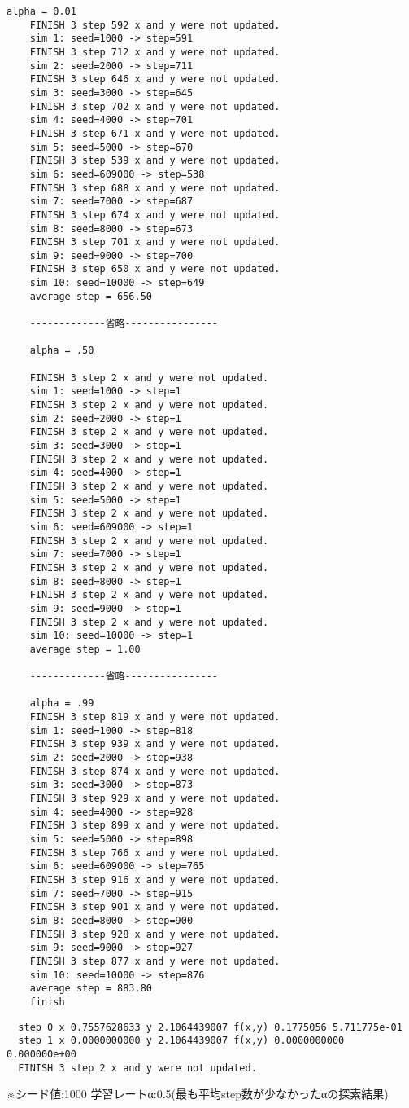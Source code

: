   \begin{lstlisting}[caption=シェルスクリプトalpha.sh実行結果,label=ラベル]
	alpha = 0.01
	FINISH 3 step 592 x and y were not updated.
	sim 1: seed=1000 -> step=591
	FINISH 3 step 712 x and y were not updated.
	sim 2: seed=2000 -> step=711
	FINISH 3 step 646 x and y were not updated.
	sim 3: seed=3000 -> step=645
	FINISH 3 step 702 x and y were not updated.
	sim 4: seed=4000 -> step=701
	FINISH 3 step 671 x and y were not updated.
	sim	5: seed=5000 -> step=670
	FINISH 3 step 539 x and y were not updated.
	sim 6: seed=609000 -> step=538
	FINISH 3 step 688 x and y were not updated.
	sim 7: seed=7000 -> step=687
	FINISH 3 step 674 x and y were not updated.
	sim 8: seed=8000 -> step=673
	FINISH 3 step 701 x and y were not updated.
	sim 9: seed=9000 -> step=700
	FINISH 3 step 650 x and y were not updated.
	sim 10: seed=10000 -> step=649
	average step = 656.50

	-------------省略----------------
	
	alpha = .50
	
	FINISH 3 step 2 x and y were not updated.
	sim 1: seed=1000 -> step=1
	FINISH 3 step 2 x and y were not updated.
	sim 2: seed=2000 -> step=1
	FINISH 3 step 2 x and y were not updated.
	sim 3: seed=3000 -> step=1
	FINISH 3 step 2 x and y were not updated.
	sim 4: seed=4000 -> step=1
	FINISH 3 step 2 x and y were not updated.
	sim 5: seed=5000 -> step=1
	FINISH 3 step 2 x and y were not updated.
	sim 6: seed=609000 -> step=1
	FINISH 3 step 2 x and y were not updated.
	sim 7: seed=7000 -> step=1
	FINISH 3 step 2 x and y were not updated.
	sim 8: seed=8000 -> step=1
	FINISH 3 step 2 x and y were not updated.
	sim 9: seed=9000 -> step=1
	FINISH 3 step 2 x and y were not updated.
	sim 10: seed=10000 -> step=1
	average step = 1.00
	
	-------------省略----------------
	
	alpha = .99
	FINISH 3 step 819 x and y were not updated.
	sim 1: seed=1000 -> step=818
	FINISH 3 step 939 x and y were not updated.
	sim 2: seed=2000 -> step=938
	FINISH 3 step 874 x and y were not updated.
	sim 3: seed=3000 -> step=873
	FINISH 3 step 929 x and y were not updated.
	sim 4: seed=4000 -> step=928
	FINISH 3 step 899 x and y were not updated.
	sim 5: seed=5000 -> step=898
	FINISH 3 step 766 x and y were not updated.
	sim 6: seed=609000 -> step=765
	FINISH 3 step 916 x and y were not updated.
	sim 7: seed=7000 -> step=915
	FINISH 3 step 901 x and y were not updated.
	sim 8: seed=8000 -> step=900
	FINISH 3 step 928 x and y were not updated.
	sim 9: seed=9000 -> step=927
	FINISH 3 step 877 x and y were not updated.
	sim 10: seed=10000 -> step=876
	average step = 883.80
	finish
  \end{lstlisting}

  \begin{lstlisting}[caption=探索プログラム実行結果,label=ラベル]
  %./steepest_decent2_1 1000 
  step 0 x 0.7557628633 y 2.1064439007 f(x,y) 0.1775056 5.711775e-01
  step 1 x 0.0000000000 y 2.1064439007 f(x,y) 0.0000000000 0.000000e+00
  FINISH 3 step 2 x and y were not updated.
  \end{lstlisting}
  ※シード値:1000 学習レートα:0.5(最も平均step数が少なかったαの探索結果)


